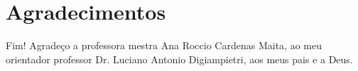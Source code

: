 \section{Agradecimentos}

\begin{frame}
	\begin{block}{Fim!}
		Agradeço a professora mestra Ana Roccio Cardenas Maita, ao meu orientador professor Dr. Luciano Antonio Digiampietri, aos meus pais e a Deus.
	\end{block}
\end{frame}
